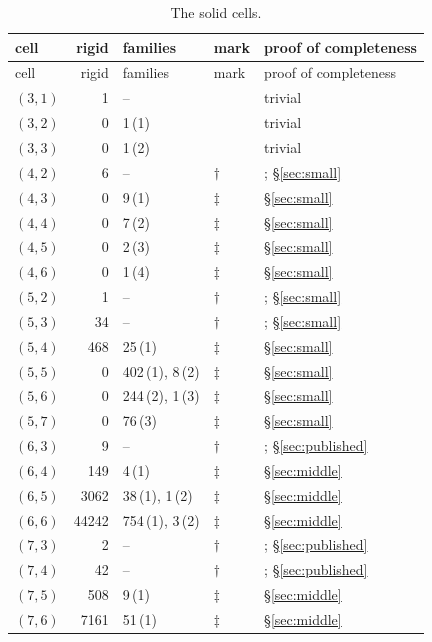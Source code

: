 \begin{longtable}{@{}lrllp{}@{}}
\caption{The solid cells.}\label{tab:cells}\\
\toprule cell & rigid & families & mark & proof of completeness \\ \midrule
\endfirsthead
\toprule cell & rigid & families & mark & proof of completeness \\ \midrule
\endhead
$(3,1)$ & 1 & -- &  & trivial \\
$(3,2)$ & 0 & 1\,(1) &  & trivial \\
$(3,3)$ & 0 & 1\,(2) &  & trivial \\
$(4,2)$ & 6 & -- & $\dagger$ & \cite{ES}; \S\ref{sec:small} \\
$(4,3)$ & 0 & 9\,(1) & $\ddagger$ & \S\ref{sec:small} \\
$(4,4)$ & 0 & 7\,(2) & $\ddagger$ & \S\ref{sec:small} \\
$(4,5)$ & 0 & 2\,(3) & $\ddagger$ & \S\ref{sec:small} \\
$(4,6)$ & 0 & 1\,(4) & $\ddagger$ & \S\ref{sec:small} \\
$(5,2)$ & 1 & -- & $\dagger$ & \cite{ES}; \S\ref{sec:small} \\
$(5,3)$ & 34 & -- & $\dagger$ & \cite{Sh04}; \S\ref{sec:small} \\
$(5,4)$ & 468 & 25\,(1) & $\ddagger$ & \S\ref{sec:small} \\
$(5,5)$ & 0 & 402\,(1), 8\,(2) & $\ddagger$ & \S\ref{sec:small} \\
$(5,6)$ & 0 & 244\,(2), 1\,(3) & $\ddagger$ & \S\ref{sec:small} \\
$(5,7)$ & 0 & 76\,(3) & $\ddagger$ & \S\ref{sec:small} \\
$(6,3)$ & 9 & -- & $\dagger$ & \cite{Sh04}; \S\ref{sec:published} \\
$(6,4)$ & 149 & 4\,(1) & $\ddagger$ & \S\ref{sec:middle} \\
$(6,5)$ & 3062 & 38\,(1), 1\,(2) & $\ddagger$ & \S\ref{sec:middle} \\
$(6,6)$ & 44242 & 754\,(1), 3\,(2) & $\ddagger$ & \S\ref{sec:middle} \\
$(7,3)$ & 2 & -- & $\dagger$ & \cite{EF,Sh04}; \S\ref{sec:published} \\
$(7,4)$ & 42 & -- & $\dagger$ & \cite{LW}; \S\ref{sec:published} \\
$(7,5)$ & 508 & 9\,(1) & $\ddagger$ & \S\ref{sec:middle} \\
$(7,6)$ & 7161 & 51\,(1) & $\ddagger$ & \S\ref{sec:middle} \\

\end{longtable}
